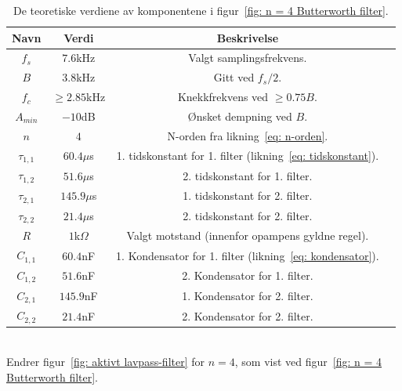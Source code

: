 \documentclass[a4paper,11pt,norsk]{article}
\begin{document}
\begin{table}[htbp]
\centering
\begin{tabular}{ |c|c|c|c| } 
\hline
\textbf{Navn} & \textbf{Verdi} & \textbf{Beskrivelse}\\
\hline
$f_s$ & $7.6$kHz & Valgt samplingsfrekvens. \\
\hline
$B$ & $3.8$kHz & Gitt ved $f_s / 2$. \\
\hline
$f_c$ & $\geq 2.85$kHz & Knekkfrekvens ved $\geq 0.75 B$. \\
\hline
$A_{min}$ & $-10$dB & Ønsket dempning ved $B$.
\\
\hline
$n$ & $4$ & N-orden fra likning~\ref{eq: n-orden}.
\\
\hline
$\tau_{1, 1}$ & $60.4\mu$s & 1. tidskonstant for 1. filter (likning~\ref{eq: tidskonstant}).
\\
\hline
$\tau_{1, 2}$ & $51.6\mu$s & 2. tidskonstant for 1. filter.
\\
\hline
$\tau_{2, 1}$ & $145.9\mu$s & 1. tidskonstant for 2. filter.
\\
\hline
$\tau_{2, 2}$ & $21.4\mu$s & 2. tidskonstant for 2. filter.
\\
\hline
$R$ & $1$k$\Omega$ & Valgt motstand (innenfor opampens gyldne regel).
\\
\hline
$C_{1, 1}$ & $60.4$nF & 1. Kondensator for 1. filter (likning~\ref{eq: kondensator}). 
\\
\hline
$C_{1, 2}$ & $51.6$nF & 2. Kondensator for 1. filter.
\\
\hline

$C_{2, 1}$ & $145.9$nF & 1. Kondensator for 2. filter.
\\
\hline
$C_{2, 2}$ & $21.4$nF & 2. Kondensator for 2. filter. 
\\
\hline
\end{tabular}
\caption{De teoretiske verdiene av komponentene i figur~\ref{fig: n = 4 Butterworth filter}. }
\label{table: teoretiske verdier}
\end{table}
\\
\newpage
Endrer figur~\ref{fig: aktivt lavpass-filter} for $n = 4$, som vist ved figur~\ref{fig: n = 4 Butterworth filter}. \\
\end{document}
